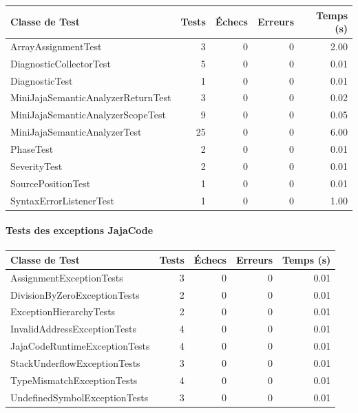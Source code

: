 \begin{center}
\small
\begin{tabular}{|l|r|r|r|r|}
\hline
\rowcolor{headerblue!20}
\textbf{Classe de Test} & \textbf{Tests} & \textbf{Échecs} & \textbf{Erreurs} & \textbf{Temps (s)} \\
\hline
ArrayAssignmentTest & 3 & 0 & 0 & 2.00 \\
\hline
DiagnosticCollectorTest & 5 & 0 & 0 & 0.01 \\
\hline
DiagnosticTest & 1 & 0 & 0 & 0.01 \\
\hline
MiniJajaSemanticAnalyzerReturnTest & 3 & 0 & 0 & 0.02 \\
\hline
MiniJajaSemanticAnalyzerScopeTest & 9 & 0 & 0 & 0.05 \\
\hline
MiniJajaSemanticAnalyzerTest & 25 & 0 & 0 & 6.00 \\
\hline
PhaseTest & 2 & 0 & 0 & 0.01 \\
\hline
SeverityTest & 2 & 0 & 0 & 0.01 \\
\hline
SourcePositionTest & 1 & 0 & 0 & 0.01 \\
\hline
SyntaxErrorListenerTest & 1 & 0 & 0 & 1.00 \\
\hline
\end{tabular}
\end{center}

\paragraph{Tests des exceptions JajaCode}

\begin{center}
\small
\begin{tabular}{|l|r|r|r|r|}
\hline
\rowcolor{headerblue!20}
\textbf{Classe de Test} & \textbf{Tests} & \textbf{Échecs} & \textbf{Erreurs} & \textbf{Temps (s)} \\
\hline
AssignmentExceptionTests & 3 & 0 & 0 & 0.01 \\
\hline
DivisionByZeroExceptionTests & 2 & 0 & 0 & 0.01 \\
\hline
ExceptionHierarchyTests & 2 & 0 & 0 & 0.01 \\
\hline
InvalidAddressExceptionTests & 4 & 0 & 0 & 0.01 \\
\hline
JajaCodeRuntimeExceptionTests & 4 & 0 & 0 & 0.01 \\
\hline
StackUnderflowExceptionTests & 3 & 0 & 0 & 0.01 \\
\hline
TypeMismatchExceptionTests & 4 & 0 & 0 & 0.01 \\
\hline
UndefinedSymbolExceptionTests & 3 & 0 & 0 & 0.01 \\
\hline
\end{tabular}
\end{center}


